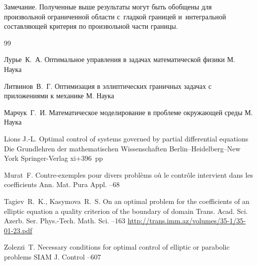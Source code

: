 {\small \sc Замечание.}  Полученные выше результаты могут быть обобщены для произвольной ограниченной области с~гладкой границей и~интегральной составляющей критерия по произвольной части границы.






\begin{thebibliography}{99}

\by Лурье~К.~А.
\book Оптимальное управления в задачах математической физики
\publaddr М.
\publ Наука

\by Литвинов~В.~Г.
\book Оптимизация в эллиптических граничных задачах с приложениями к механике
\publaddr М.
\publ Наука

\by Марчук~Г.~И.
\book Математическое моделирование в проблеме окружающей среды
\publaddr М.
\publ Наука

\by Lions J.-L.
\book  Optimal control of systems governed by partial differential equations
\serial Die Grundlehren der mathematischen Wissenschaften
\publaddr Berlin--Heidelberg--New York
\publ Springer-Verlag
\totalpages xi+396~pp \nofrills
{}

\by Murat~F.
\paper Contre-exemples pour divers probl\`ems o\`u le contr\^ole intervient dans les coefficients
\jour Ann. Mat. Pura Appl.
--68


\by Tagiev~R.~K., Kasymova~R.~S.
\paper On an optimal problem for the coefficients of an elliptic equation a quality criterion of the boundary of domain 
\jour Trans. Acad. Sci. Azerb. Ser. Phys.-Tech. Math. Sci. 
--163
\elink \url{http://trans.imm.az/volumes/35-1/35-01-23.pdf}

\by Zolezzi~T.
\paper Necessary conditions for optimal control of elliptic or parabolic problems 
\jour SIAM J. Control
--607




\end{thebibliography}
